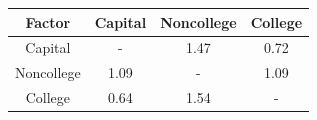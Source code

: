 \begin{table}[!ht]
\setlength\tabcolsep{0.425em}
\setlength\aboverulesep{0pt}
\setlength\belowrulesep{0.2em}
\centering
\begin{threeparttable}
\begin{tabular}{cccc}
\toprule[0.1em]
Factor & Capital & Noncollege & College \\[0.2em]
\midrule[0.075em]
Capital & - & 1.47 & 0.72 \\[0.2em]
Noncollege & 1.09 & - & 1.09 \\[0.2em]
College & 0.64 & 1.54 & - \\[0.2em]
\bottomrule[0.1em]
\end{tabular}
\end{threeparttable}
\end{table}

